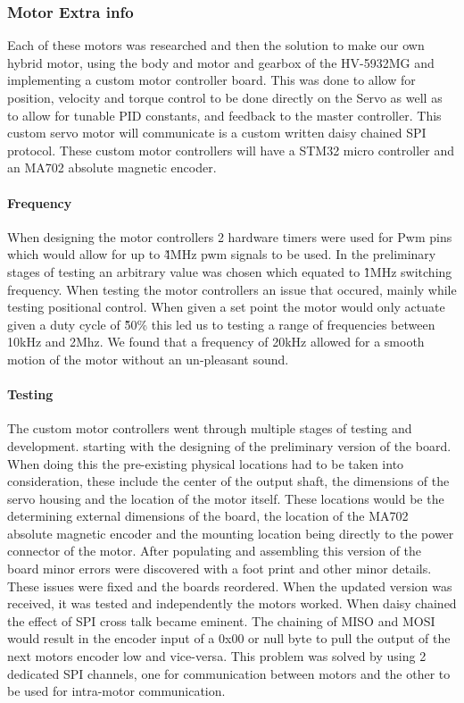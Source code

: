         \subsubsection{Motor Extra info}
        Each of these motors was researched and then the solution to make our own hybrid motor, using the body and motor and gearbox of the HV-5932MG and implementing a custom motor controller board. This was done to allow for position, velocity and torque control to be done directly on the Servo as well as to allow for tunable PID constants, and feedback to the master controller. This custom servo motor will communicate is a custom written daisy chained SPI protocol. These custom motor controllers will have a STM32 micro controller and an MA702 absolute magnetic encoder\cite{MA702}.
        \paragraph{Frequency}
        When designing the motor controllers 2 hardware timers were used for Pwm pins which would allow for up to \~4MHz pwm signals to be used. In the preliminary stages of testing an arbitrary value was chosen which equated to \~1MHz switching frequency. When testing the motor controllers an issue that occured, mainly while testing positional control. When given a set point the motor would only actuate given a duty cycle of  \~50\% this led us to testing a range of frequencies between 10kHz and 2Mhz. We found that a frequency of 20kHz allowed for a smooth motion of the motor without an un-pleasant sound.  
        \paragraph{Testing} 
        The custom motor controllers went through multiple stages of testing and development. starting with the designing of the preliminary version of the board. When doing this the pre-existing physical locations had to be taken into consideration, these include the center of the output shaft, the dimensions of the servo housing and the location of the motor itself. These locations would be the determining external dimensions of the board, the location of the MA702 absolute magnetic encoder and the mounting location being directly to the power connector of the motor. After populating and assembling this version of the board minor errors were discovered with a foot print and other minor details. These issues were fixed and the boards reordered. When the updated version was received, it was tested and independently the motors worked. When daisy chained the effect of SPI cross talk became eminent. The chaining of MISO and MOSI would result in the encoder input of a 0x00 or null byte to pull the output of the next motors encoder low and vice-versa. This problem was solved by using 2 dedicated SPI channels, one for communication between motors and the other to be used for intra-motor communication. 

